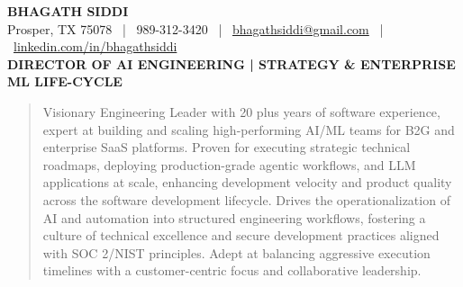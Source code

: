 \documentclass[9pt, letterpaper]{extarticle}
\begin{document}
\begin{center}
    {\huge \textbf{BHAGATH SIDDI}} \\
    \vspace{2pt}
    \small Prosper, TX 75078 \ | \ 989-312-3420 \ | \ \href{mailto:bhagathsiddi@gmail.com}{bhagathsiddi@gmail.com} \ | \ \href{https://www.linkedin.com/in/bhagathsiddi}{linkedin.com/in/bhagathsiddi} \\
    \vspace{4pt} 
    \textbf{\large DIRECTOR OF AI ENGINEERING | STRATEGY \& ENTERPRISE ML LIFE-CYCLE}
\end{center}

\vspace{-4pt}
\begin{quote}
\small \centering
Visionary Engineering Leader with 20 plus years of software experience, expert at building and scaling high-performing AI/ML teams for B2G and enterprise SaaS platforms. Proven for executing strategic technical roadmaps, deploying production-grade agentic workflows, and LLM applications at scale, enhancing development velocity and product quality across the software development lifecycle. Drives the operationalization of AI and automation into structured engineering workflows, fostering a culture of technical excellence and secure development practices aligned with SOC 2/NIST principles. Adept at balancing aggressive execution timelines with a customer-centric focus and collaborative leadership.
\end{quote}

\vspace{-4pt}

\end{document}
